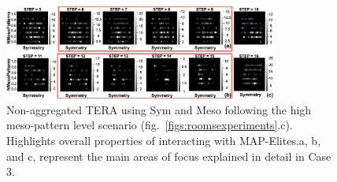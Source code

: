 \begin{figure}[ht]
\centerline{\includegraphics[width=0.8\textwidth]{figures/exp4-mesopat-explorDeadend_leavesearch/simple__X-sym-Y-mesoPat-simplify-combo-2.png}}
\caption{Non-aggregated TERA using Sym and Meso following the high meso-pattern level scenario (fig.~\ref{figs:roomsexperiments}.c). Highlights overall properties of interacting with MAP-Elites.a, b, and c, represent the main areas of focus explained in detail in Case 3.}
\label{figs:exp3}
\end{figure}









